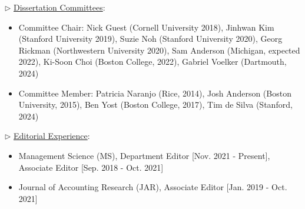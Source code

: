 \documentclass[11pt]{article}
\begin{document}
\vspace*{.07in}
$\triangleright$  \underline{Dissertation Committees}: 
\vspace*{-.07in}
	\begin{itemize} 
		\item Committee Chair: Nick Guest (Cornell University 2018), Jinhwan Kim (Stanford University 2019), Suzie Noh (Stanford University 2020), Georg Rickman (Northwestern University 2020), Sam Anderson (Michigan, expected 2022), Ki-Soon Choi (Boston College, 2022), Gabriel Voelker (Dartmouth, 2024)
		
		\item Committee Member: Patricia Naranjo (Rice, 2014), Josh Anderson (Boston University, 2015), Ben Yost (Boston College, 2017), Tim de Silva (Stanford, 2024)

	\end{itemize}
\vspace*{.07in}
$\triangleright$ \underline{Editorial Experience}: 
\vspace*{-.07in}
	\begin{itemize} 
		\item	Management Science (MS), Department Editor [Nov. 2021 - Present], Associate Editor [Sep. 2018 - Oct. 2021]\\
			\vspace*{-.3in}
		\item	Journal of Accounting Research (JAR), Associate Editor [Jan. 2019 - Oct. 2021]\\
			\vspace*{-.3in}
	\end{itemize}
	

\end{document}
